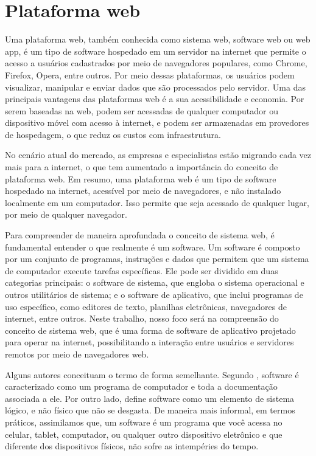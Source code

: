 \documentclass[tcc,capa]{texufpel}
\begin{document}
\section{Plataforma web}
Uma plataforma web, também conhecida como sistema web, software web ou web app, é um tipo de software hospedado em um servidor na internet que permite o acesso a usuários cadastrados por meio de navegadores populares, como Chrome, Firefox, Opera, entre outros. Por meio dessas plataformas, os usuários podem visualizar, manipular e enviar dados que são processados pelo servidor. Uma das principais vantagens das plataformas web é a sua acessibilidade e economia. Por serem baseadas na web, podem ser acessadas de qualquer computador ou dispositivo móvel com acesso à internet, e podem ser armazenadas em provedores de hospedagem, o que reduz os custos com infraestrutura.

No cenário atual do mercado, as empresas e especialistas estão migrando cada vez mais para a internet, o que tem aumentado a importância do conceito de plataforma web. Em resumo, uma plataforma web é um tipo de software hospedado na internet, acessível por meio de navegadores, e não instalado localmente em um computador. Isso permite que seja acessado de qualquer lugar, por meio de qualquer navegador.

Para compreender de maneira aprofundada o conceito de sistema web, é fundamental entender o que realmente é um software. Um software é composto por um conjunto de programas, instruções e dados que permitem que um sistema de computador execute tarefas específicas. Ele pode ser dividido em duas categorias principais: o software de sistema, que engloba o sistema operacional e outros utilitários de sistema; e o software de aplicativo, que inclui programas de uso específico, como editores de texto, planilhas eletrônicas, navegadores de internet, entre outros. Neste trabalho, nosso foco será na compreensão do conceito de sistema web, que é uma forma de software de aplicativo projetado para operar na internet, possibilitando a interação entre usuários e servidores remotos por meio de navegadores web.

Alguns autores conceituam o termo de forma semelhante. Segundo \citet{SOMMERVILLE:2011}, software é caracterizado como um programa de computador e toda a documentação associada a ele. Por outro lado, \citet{PRESSMAN:2016} define software como um elemento de sistema lógico, e não físico que não se desgasta. De maneira mais informal, em termos práticos, assimilamos que, um software é um programa que você acessa no celular, tablet, computador, ou qualquer outro dispositivo eletrônico e que diferente dos dispositivos físicos, não sofre as intempéries do tempo.
\end{document}
